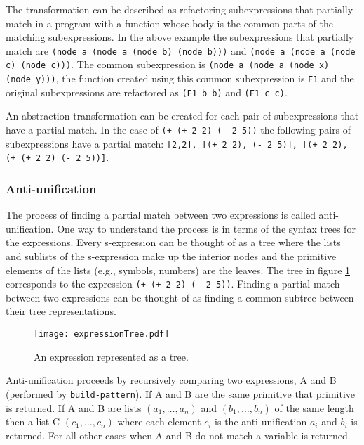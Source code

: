 \documentclass[a4paper,10pt]{article}
\begin{document}
  The transformation can be described as refactoring subexpressions that partially match in a program with a function whose body is the common parts of the matching subexpressions.  In the above example the subexpressions that partially match are \texttt{(node a (node a (node b) (node b)))} and \texttt{(node a (node a (node c) (node c)))}.  The common subexpression is \texttt{(node a (node a (node x) (node y)))}, the function created using this common subexpression is \texttt{F1} and the original subexpressions are refactored as \texttt{(F1 b b)} and \texttt{(F1 c c)}.

An abstraction transformation can be created for each pair of subexpressions that have a partial match.  In the case of \texttt{(+ (+ 2 2) (- 2 5))} the following pairs of subexpressions have a partial match: \texttt{[2,2], [(+ 2 2), (- 2 5)], [(+ 2 2), (+ (+ 2 2) (- 2 5))]}.
\subsubsection{Anti-unification}
The process of finding a partial match between two expressions is called anti-unification.  One way to understand the process is in terms of the syntax trees for the expressions.  Every s-expression can be thought of as a tree where the lists and sublists of the s-expression make up the interior nodes and the primitive elements of the lists (e.g., symbols, numbers) are the leaves.  The tree in figure \ref{expressionTree} corresponds to the expression \texttt{(+ (+ 2 2) (- 2 5))}.  Finding a partial match between two expressions can be thought of as finding a common subtree between their tree representations.
\begin{figure}[h]
\begin{center}
\texttt{[image: expressionTree.pdf]}
\caption{An expression represented as a tree.}
\label{expressionTree}
\end{center}
\end{figure}

Anti-unification proceeds by recursively comparing two expressions, A and B (performed by \texttt{build-pattern}).  If A and B are the same primitive that primitive is returned.  If A and B are lists $(a_1,\ldots,a_n)$ and $(b_1,\ldots,b_n)$ of the same length then a list C $(c_1,\ldots,c_n)$ where each element $c_i$ is the anti-unification $a_i$ and $b_i$ is returned.  For all other cases when A and B do not match a variable is returned.
\end{document}
